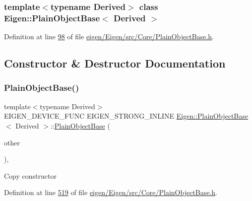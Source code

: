 \subsubsection*{template$<$typename Derived$>$\newline
class Eigen\+::\+Plain\+Object\+Base$<$ Derived $>$}



Definition at line \hyperlink{eigen_2_eigen_2src_2_core_2_plain_object_base_8h_source_l00098}{98} of file \hyperlink{eigen_2_eigen_2src_2_core_2_plain_object_base_8h_source}{eigen/\+Eigen/src/\+Core/\+Plain\+Object\+Base.\+h}.



\subsection{Constructor \& Destructor Documentation}
\mbox{\label{class_eigen_1_1_plain_object_base_a69656a28768b9b6f8b283e251d3552be}} 
\subsubsection{\texorpdfstring{Plain\+Object\+Base()}{PlainObjectBase()}\hspace{0.1cm}{\footnotesize\ttfamily [1/6]}}
{\footnotesize\ttfamily template$<$typename Derived$>$ \\
E\+I\+G\+E\+N\+\_\+\+D\+E\+V\+I\+C\+E\+\_\+\+F\+U\+NC E\+I\+G\+E\+N\+\_\+\+S\+T\+R\+O\+N\+G\+\_\+\+I\+N\+L\+I\+NE \hyperlink{class_eigen_1_1_plain_object_base}{Eigen\+::\+Plain\+Object\+Base}$<$ Derived $>$\+::\hyperlink{class_eigen_1_1_plain_object_base}{Plain\+Object\+Base} (\begin{DoxyParamCaption}\item[{const \hyperlink{class_eigen_1_1_plain_object_base}{Plain\+Object\+Base}$<$ Derived $>$ \&}]{other }\end{DoxyParamCaption})\hspace{0.3cm}{\ttfamily [inline]}, {\ttfamily [protected]}}

Copy constructor 

Definition at line \hyperlink{eigen_2_eigen_2src_2_core_2_plain_object_base_8h_source_l00519}{519} of file \hyperlink{eigen_2_eigen_2src_2_core_2_plain_object_base_8h_source}{eigen/\+Eigen/src/\+Core/\+Plain\+Object\+Base.\+h}.

